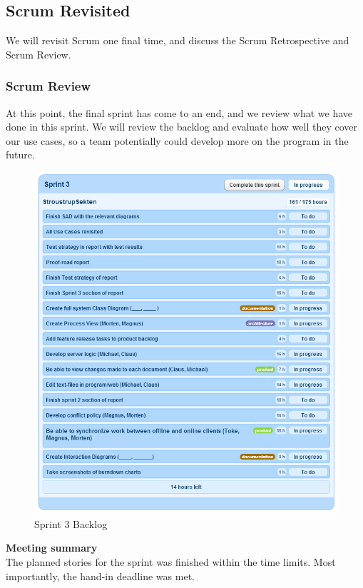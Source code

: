 \subsection{Scrum Revisited}
We will revisit Scrum one final time, and discuss the Scrum Retrospective and Scrum Review.
\subsubsection{Scrum Review}
At this point, the final sprint has come to an end, and we review what we have done in this sprint. We will review the backlog and evaluate how well they cover our use cases, so a team potentially could develop more on the program in the future.  \\
\newline
\begin{figure}[H]
  \includegraphics[width=\textwidth]{illustrations/sprint3backlog.PNG}
  \caption{Sprint 3 Backlog}
  \label{sprint3backlog}
\end{figure}
\textbf{Meeting summary}\\
The planned stories for the sprint was finished within the time limits. Most importantly, the hand-in deadline was met.\\
